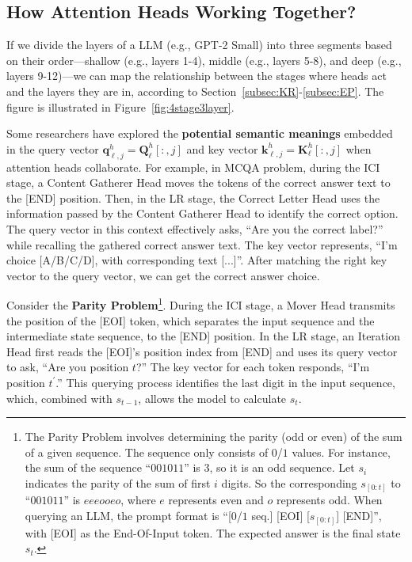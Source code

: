 \documentclass{article}
\begin{document}
\subsection{How Attention Heads Working Together?} \label{subsec:WorkTogether}
If we divide the layers of a LLM (e.g., GPT-2 Small) into three segments based on their order—shallow (e.g., layers 1-4), middle (e.g., layers 5-8), and deep (e.g., layers 9-12)—we can map the relationship between the stages where heads act and the layers they are in, according to Section~\ref{subsec:KR}-\ref{subsec:EP}. The figure is illustrated in Figure~\ref{fig:4stage3layer}.

Some researchers have explored the \textbf{potential semantic meanings} embedded in the query vector $\mathbf{q}_{\ell, j}^h=\mathbf{Q}_{\ell}^h[:, j]$ and key vector $\mathbf{k}_{\ell, j}^h=\mathbf{K}_{\ell}^h[:, j]$ when attention heads collaborate. For example, in MCQA problem, during the ICI stage, a Content Gatherer Head moves the tokens of the correct answer text to the [END] position. Then, in the LR stage, the Correct Letter Head uses the information passed by the Content Gatherer Head to identify the correct option. The query vector in this context effectively asks, ``Are you the correct label?'' while recalling the gathered correct answer text. The key vector represents, ``I'm choice [A/B/C/D], with corresponding text [...]''. After matching the right key vector to the query vector, we can get the correct answer choice.

Consider the \textbf{Parity Problem}\footnote{The Parity Problem involves determining the parity (odd or even) of the sum of a given sequence. The sequence only consists of $0$/$1$ values. For instance, the sum of the sequence ``$001011$'' is 3, so it is an odd sequence. Let $s_{i}$ indicates the parity of the sum of first $i$ digits. So the corresponding $s_{\left[0:t\right]}$ to ``$001011$'' is $eeeooeo$, where $e$ represents even and $o$ represents odd. When querying an LLM, the prompt format is ``[$0$/$1$ seq.] [EOI] [$s_{\left[0:t\right]}$] [END]'', with [EOI] as the End-Of-Input token. The expected answer is the final state $s_{t}$.}.
During the ICI stage, a Mover Head transmits the position of the [EOI] token, which separates the input sequence and the intermediate state sequence, to the [END] position.
In the LR stage, an Iteration Head first reads the [EOI]'s position index from [END] and uses its query vector to ask, ``Are you position $t$?'' The key vector for each token responds, ``I'm position $t^{'}$.'' This querying process identifies the last digit in the input sequence, which, combined with $s_{t-1}$, allows the model to calculate $s_{t}$.
\end{document}
